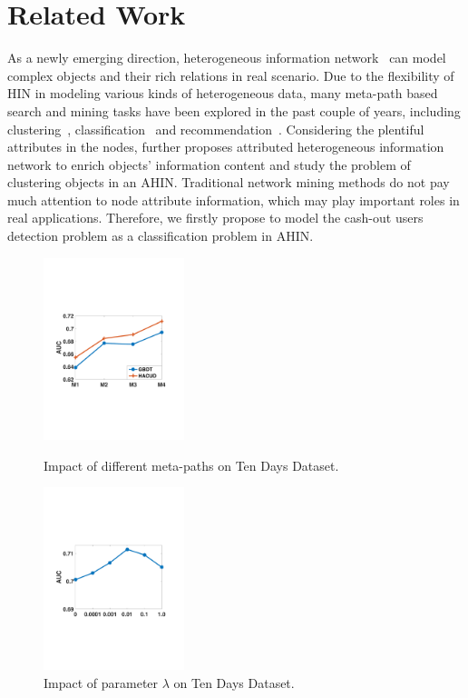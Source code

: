 \section{Related Work}

As a newly emerging direction, heterogeneous information network~\citep{shi2017survey} can model complex objects and their rich relations in real scenario. Due to the flexibility of HIN in modeling various kinds of heterogeneous data, many meta-path based search and mining tasks
have been explored in the past couple of years, including clustering~\citep{Sun2012Integrating}, classification~\citep{Ji2011Ranking} and recommendation~\citep{hu2018leveraging}. Considering the plentiful attributes in the nodes, \cite{Li2017Semi} further proposes attributed heterogeneous information network to enrich objects' information content and study the problem of clustering objects in an AHIN. Traditional network mining methods do not pay much attention to node attribute information, which may play important roles in real applications. Therefore, we firstly propose to model the cash-out users detection problem as a classification problem in AHIN.

\begin{figure}[t]
\begin{minipage}[t]{0.45\linewidth}
\centering
\includegraphics[width=4.1cm]{image/metapath.pdf}
\caption{Impact of different meta-paths on Ten Days Dataset.}
\label{fig-metapath}
\end{minipage}
\begin{minipage}[t]{0.45\linewidth}
\centering
\includegraphics[width=4.1cm]{image/lambda.pdf}
\caption{Impact of parameter $\lambda$  on Ten Days Dataset.}
\label{fig-lambda}
\end{minipage}
\end{figure}

